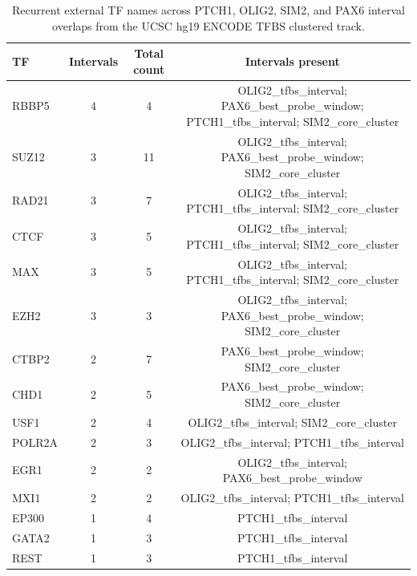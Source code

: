 \begin{table}[htbp]
\centering
\caption{Recurrent external TF names across PTCH1, OLIG2, SIM2, and PAX6 interval overlaps from the UCSC hg19 ENCODE TFBS clustered track.}
\label{tab:external_recurrent_tf}
\begin{tabular}{lccc}
\hline
TF & Intervals & Total count & Intervals present \\
\hline
RBBP5 & 4 & 4 & OLIG2\_tfbs\_interval; PAX6\_best\_probe\_window; PTCH1\_tfbs\_interval; SIM2\_core\_cluster \\
SUZ12 & 3 & 11 & OLIG2\_tfbs\_interval; PAX6\_best\_probe\_window; SIM2\_core\_cluster \\
RAD21 & 3 & 7 & OLIG2\_tfbs\_interval; PTCH1\_tfbs\_interval; SIM2\_core\_cluster \\
CTCF & 3 & 5 & OLIG2\_tfbs\_interval; PTCH1\_tfbs\_interval; SIM2\_core\_cluster \\
MAX & 3 & 5 & OLIG2\_tfbs\_interval; PTCH1\_tfbs\_interval; SIM2\_core\_cluster \\
EZH2 & 3 & 3 & OLIG2\_tfbs\_interval; PAX6\_best\_probe\_window; SIM2\_core\_cluster \\
CTBP2 & 2 & 7 & PAX6\_best\_probe\_window; SIM2\_core\_cluster \\
CHD1 & 2 & 5 & PAX6\_best\_probe\_window; SIM2\_core\_cluster \\
USF1 & 2 & 4 & OLIG2\_tfbs\_interval; SIM2\_core\_cluster \\
POLR2A & 2 & 3 & OLIG2\_tfbs\_interval; PTCH1\_tfbs\_interval \\
EGR1 & 2 & 2 & OLIG2\_tfbs\_interval; PAX6\_best\_probe\_window \\
MXI1 & 2 & 2 & OLIG2\_tfbs\_interval; PTCH1\_tfbs\_interval \\
EP300 & 1 & 4 & PTCH1\_tfbs\_interval \\
GATA2 & 1 & 3 & PTCH1\_tfbs\_interval \\
REST & 1 & 3 & PTCH1\_tfbs\_interval \\
\hline
\end{tabular}
\end{table}
